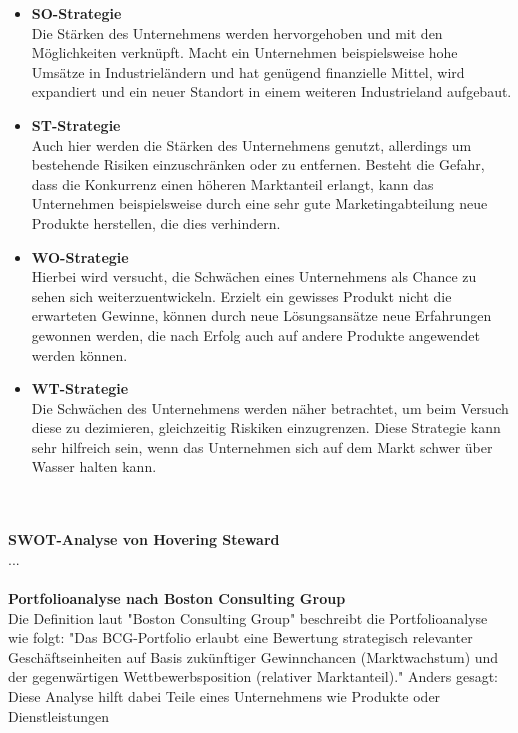   \begin{itemize}
    \item \textbf{SO-Strategie}\\
    Die Stärken des Unternehmens werden hervorgehoben und mit den Möglichkeiten verknüpft. Macht ein Unternehmen beispielsweise hohe Umsätze in Industrieländern und hat
    genügend finanzielle Mittel, wird expandiert und ein neuer Standort in einem weiteren Industrieland aufgebaut.

    \item \textbf{ST-Strategie}\\
    Auch hier werden die Stärken des Unternehmens genutzt, allerdings um bestehende Risiken einzuschränken oder zu entfernen. Besteht die Gefahr, dass die Konkurrenz
    einen höheren Marktanteil erlangt, kann das Unternehmen beispielsweise durch eine sehr gute Marketingabteilung neue Produkte herstellen, die dies verhindern.

    \item \textbf{WO-Strategie}\\
    Hierbei wird versucht, die Schwächen eines Unternehmens als Chance zu sehen sich weiterzuentwickeln. Erzielt ein gewisses Produkt nicht die erwarteten Gewinne,
    können durch neue Lösungsansätze neue Erfahrungen gewonnen werden, die nach Erfolg auch auf andere Produkte angewendet werden können.

    \item \textbf{WT-Strategie}\\
    Die Schwächen des Unternehmens werden näher betrachtet, um beim Versuch diese zu dezimieren, gleichzeitig Riskiken einzugrenzen. Diese Strategie kann sehr hilfreich
    sein, wenn das Unternehmen sich auf dem Markt schwer über Wasser halten kann.
  \end{itemize}\\
  \\
  \textbf{SWOT-Analyse von Hovering Steward}\\
  ...\\
  \\
  \textbf{Portfolioanalyse nach Boston Consulting Group}\\
  Die Definition laut {"Boston Consulting Group"\cite{portfolioanalyse}} beschreibt die Portfolioanalyse wie folgt:
  "Das BCG-Portfolio erlaubt eine Bewertung strategisch relevanter Geschäftseinheiten auf Basis zukünftiger Gewinnchancen (Marktwachstum) und der
  gegenwärtigen Wettbewerbsposition (relativer Marktanteil)." Anders gesagt: Diese Analyse hilft dabei Teile eines Unternehmens wie Produkte oder Dienstleistungen
